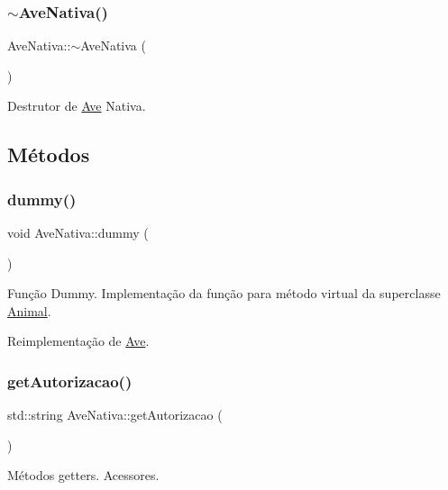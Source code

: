 \subsubsection{\texorpdfstring{$\sim$\+Ave\+Nativa()}{~AveNativa()}}
{\footnotesize\ttfamily Ave\+Nativa\+::$\sim$\+Ave\+Nativa (\begin{DoxyParamCaption}{ }\end{DoxyParamCaption})}

Destrutor de \hyperlink{classAve}{Ave} Nativa. 

\subsection{Métodos}
\mbox{\label{classAveNativa_ad4af9772d84390bc0646dcfc9cd931ee}} 
\subsubsection{\texorpdfstring{dummy()}{dummy()}}
{\footnotesize\ttfamily void Ave\+Nativa\+::dummy (\begin{DoxyParamCaption}{ }\end{DoxyParamCaption})\hspace{0.3cm}{\ttfamily [virtual]}}

Função Dummy. Implementação da função para método virtual da superclasse \hyperlink{classAnimal}{Animal}. 

Reimplementação de \hyperlink{classAve_a9cf98dd6d66c29bc4d8e4f23992ead9c}{Ave}.

\mbox{\label{classAveNativa_ad6a42e383e34113af96e5d6ac1304b10}} 
\subsubsection{\texorpdfstring{get\+Autorizacao()}{getAutorizacao()}}
{\footnotesize\ttfamily std\+::string Ave\+Nativa\+::get\+Autorizacao (\begin{DoxyParamCaption}{ }\end{DoxyParamCaption})}

Métodos getters. Acessores. \mbox{\label{classAveNativa_a32b27a5520b20c3420696b51d3850f25}} 
